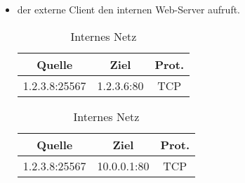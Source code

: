 \begin{enumerate}[(a)]
\begin{itemize}
            \item der externe Client den internen Web-Server aufruft.
                \begin{table}[h]
                    \begin{minipage}{0.49\linewidth}
                        \centering
                        \begin{tabular}{ccc}
                            Quelle          & Ziel       & Prot. \\
                            \hline
                            1.2.3.8:25567   & 1.2.3.6:80 & TCP \\
                        \end{tabular}
                        \caption{Externes Netz}
                    \end{minipage}
                    \begin{minipage}{0.49\linewidth}
                        \centering
                        \begin{tabular}{ccc}
                            Quelle          & Ziel        & Prot. \\
                            \hline
                            1.2.3.8:25567   & 10.0.0.1:80 & TCP \\
                        \end{tabular}
                        \caption{Internes Netz}
                    \end{minipage}
                \end{table}
        \end{itemize}
\end{enumerate}
